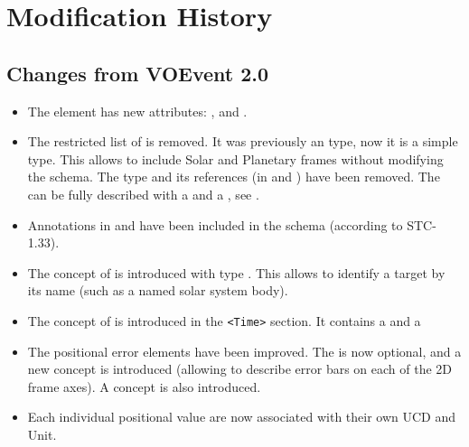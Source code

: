 \documentclass[11pt,a4paper]{ivoa}
\begin{document}


\appendix

\section{Modification History}
\subsection{Changes from VOEvent 2.0}
\label{appendix:last-changes}
\begin{itemize}
\item The  element has new attributes: ,
 and .
\item The restricted list of  is removed. It was
previously an  type, now it is a simple  type.
This allows to include Solar and Planetary frames without modifying the
schema. The  type and its references (in 
and ) have been removed. The  can
be fully described with a  and a , see 
\citet{2007ivoa.spec.1030R}.
\item Annotations in  and 
have been included in the schema (according to STC-1.33).
\item The concept of  is introduced with
type . This allows to identify a target by its name (such as a named solar
system body).
\item The concept of  is introduced in the \verb|<Time>|
section. It contains a  and a 
\item The positional error elements have been improved. The 
is now optional, and a new 
concept is introduced (allowing to describe error bars on each of the 2D frame
axes). A  concept is also introduced.
\item Each individual positional value are now associated with their own UCD
and Unit.
\end{itemize}
\end{document}
